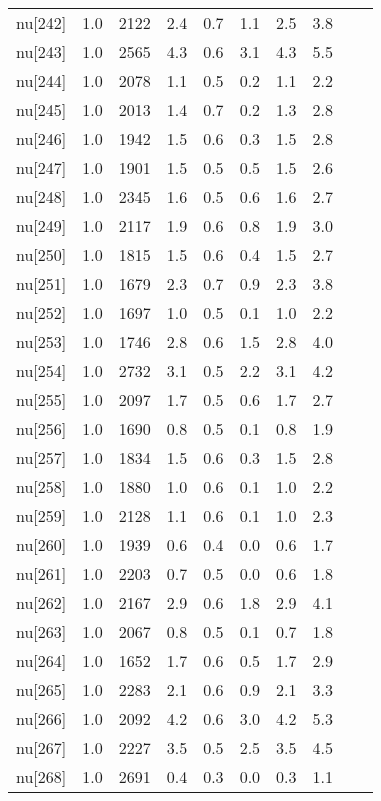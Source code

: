 \begin{longtable}{lrrrrrrr p{} | p{} |}
  nu[242] & 1.0 & 2122 & 2.4 & 0.7 & 1.1 & 2.5 & 3.8 \\ 
  nu[243] & 1.0 & 2565 & 4.3 & 0.6 & 3.1 & 4.3 & 5.5 \\ 
  nu[244] & 1.0 & 2078 & 1.1 & 0.5 & 0.2 & 1.1 & 2.2 \\ 
  nu[245] & 1.0 & 2013 & 1.4 & 0.7 & 0.2 & 1.3 & 2.8 \\ 
  nu[246] & 1.0 & 1942 & 1.5 & 0.6 & 0.3 & 1.5 & 2.8 \\ 
  nu[247] & 1.0 & 1901 & 1.5 & 0.5 & 0.5 & 1.5 & 2.6 \\ 
  nu[248] & 1.0 & 2345 & 1.6 & 0.5 & 0.6 & 1.6 & 2.7 \\ 
  nu[249] & 1.0 & 2117 & 1.9 & 0.6 & 0.8 & 1.9 & 3.0 \\ 
  nu[250] & 1.0 & 1815 & 1.5 & 0.6 & 0.4 & 1.5 & 2.7 \\ 
  nu[251] & 1.0 & 1679 & 2.3 & 0.7 & 0.9 & 2.3 & 3.8 \\ 
  nu[252] & 1.0 & 1697 & 1.0 & 0.5 & 0.1 & 1.0 & 2.2 \\ 
  nu[253] & 1.0 & 1746 & 2.8 & 0.6 & 1.5 & 2.8 & 4.0 \\ 
  nu[254] & 1.0 & 2732 & 3.1 & 0.5 & 2.2 & 3.1 & 4.2 \\ 
  nu[255] & 1.0 & 2097 & 1.7 & 0.5 & 0.6 & 1.7 & 2.7 \\ 
  nu[256] & 1.0 & 1690 & 0.8 & 0.5 & 0.1 & 0.8 & 1.9 \\ 
  nu[257] & 1.0 & 1834 & 1.5 & 0.6 & 0.3 & 1.5 & 2.8 \\ 
  nu[258] & 1.0 & 1880 & 1.0 & 0.6 & 0.1 & 1.0 & 2.2 \\ 
  nu[259] & 1.0 & 2128 & 1.1 & 0.6 & 0.1 & 1.0 & 2.3 \\ 
  nu[260] & 1.0 & 1939 & 0.6 & 0.4 & 0.0 & 0.6 & 1.7 \\ 
  nu[261] & 1.0 & 2203 & 0.7 & 0.5 & 0.0 & 0.6 & 1.8 \\ 
  nu[262] & 1.0 & 2167 & 2.9 & 0.6 & 1.8 & 2.9 & 4.1 \\ 
  nu[263] & 1.0 & 2067 & 0.8 & 0.5 & 0.1 & 0.7 & 1.8 \\ 
  nu[264] & 1.0 & 1652 & 1.7 & 0.6 & 0.5 & 1.7 & 2.9 \\ 
  nu[265] & 1.0 & 2283 & 2.1 & 0.6 & 0.9 & 2.1 & 3.3 \\ 
  nu[266] & 1.0 & 2092 & 4.2 & 0.6 & 3.0 & 4.2 & 5.3 \\ 
  nu[267] & 1.0 & 2227 & 3.5 & 0.5 & 2.5 & 3.5 & 4.5 \\ 
  nu[268] & 1.0 & 2691 & 0.4 & 0.3 & 0.0 & 0.3 & 1.1 \\ 

\end{longtable}

